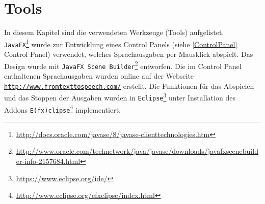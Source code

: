 \documentclass[12pt,a4paper]{scrartcl}
\begin{document}

\section{Tools}
In diesem Kapitel sind die verwendeten Werkzeuge (Tools) aufgelistet. \\
\texttt{JavaFX}\footnote{\label{foot:javafx}\url{http://docs.oracle.com/javase/8/javase-clienttechnologies.htm}} wurde zur Entwicklung eines Control Panels (siehe \ref{ControlPanel} Control Panel) verwendet, welches Sprachausgaben per Mausklick abspielt. Das Design wurde mit \texttt{JavaFX Scene Builder}\footnote{\label{foot:javafxsb}\url{
http://www.oracle.com/technetwork/java/javase/downloads/javafxscenebuilder-info-2157684.html}} entworfen. Die im Control Panel enthaltenen Sprachausgaben wurden online auf der Webseite \texttt{\url{http://www.fromtexttospeech.com/}} erstellt. 
Die Funktionen für das Abspielen und das Stoppen der Ausgaben wurden in \texttt{Eclipse}\footnote{\label{foot:eclipse}\url{
https://www.eclipse.org/ide/}} unter Installation des Addons \texttt{E(fx)clipse}\footnote{\label{foot:efxclipse}\url{
http://www.eclipse.org/efxclipse/index.html}} implementiert. \\
\end{document}
